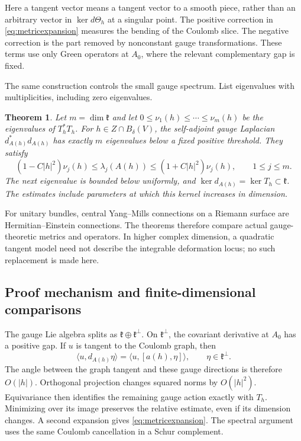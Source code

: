 \documentclass[11pt]{amsart}
\newtheorem{theorem}{Theorem}[section]
\theoremstyle{definition}
\theoremstyle{remark}
\newcommand{\kk}{\mathfrak k}
\newcommand{\ip}[2]{\langle #1,#2\rangle}
\begin{document}
Here a tangent vector means a tangent vector to a smooth piece, rather
than an arbitrary vector in $\ker d\Theta_h$ at a singular point.
The positive correction in \eqref{eq:metricexpansion} measures the
bending of the Coulomb slice. The negative correction is the part
removed by nonconstant gauge transformations. These terms use only
Green operators at $A_0$, where the relevant complementary gap is
fixed.

The same construction controls the small gauge spectrum. List
eigenvalues with multiplicities, including zero eigenvalues.

\begin{theorem}\label{thm:spectrum}
Let $m=\dim\kk$ and let
$0\leq\nu_1(h)\leq\cdots\leq\nu_m(h)$ be the eigenvalues of
$T_h^*T_h$. For $h\in Z\cap B_\delta(V)$, the self-adjoint gauge
Laplacian $d_{A(h)}^*d_{A(h)}$ has exactly $m$ eigenvalues below a fixed
positive threshold. They satisfy
\begin{equation}\label{eq:small}
 (1-C|h|^2)\nu_j(h)\leq\lambda_j(A(h))
       \leq(1+C|h|^2)\nu_j(h),\qquad 1\leq j\leq m.
\end{equation}
The next eigenvalue is bounded below uniformly, and
$\ker d_{A(h)}=\ker T_h\subset\kk$. The estimates include parameters
at which this kernel increases in dimension.
\end{theorem}

For unitary bundles, central Yang--Mills connections on a Riemann
surface are Hermitian--Einstein connections. The theorems therefore
compare actual gauge-theoretic metrics and operators. In higher complex
dimension, a quadratic tangent model need not describe the integrable
deformation locus; no such replacement is made here.

\subsection{Proof mechanism and finite-dimensional comparisons}
The gauge Lie algebra splits as $\kk\oplus\kk^\perp$. On
$\kk^\perp$, the covariant derivative at $A_0$ has a positive gap.
If $u$ is tangent to the Coulomb graph, then
\[
 \ip{u}{d_{A(h)}\eta}=\ip{u}{[a(h),\eta]},
 \qquad \eta\in\kk^\perp.
\]
The angle between the graph tangent and these gauge directions is
therefore $O(|h|)$. Orthogonal projection changes squared norms by
$O(|h|^2)$. Equivariance then identifies the remaining gauge action
exactly with $T_h$. Minimizing over its image preserves the relative
estimate, even if its dimension changes. A second expansion gives
\eqref{eq:metricexpansion}. The spectral argument uses the same
Coulomb cancellation in a Schur complement.
\end{document}
